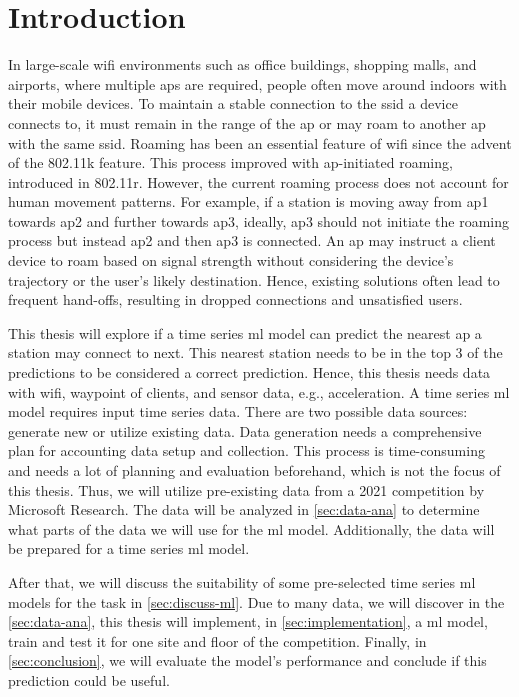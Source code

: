 \chapter{Introduction}\label{sec:intro}

In large-scale \ac{wifi} environments such as office buildings, shopping malls, and airports, where multiple \acp{ap} are required, people often move around indoors with their mobile devices.
To maintain a stable connection to the \ac{ssid} a device connects to, it must remain in the range of the \ac{ap} or may roam to another \ac{ap} with the same \ac{ssid}.
Roaming has been an essential feature of \ac{wifi} since the advent of the 802.11k\cite{802.11k} feature.
This process improved with \ac{ap}-initiated roaming, introduced in 802.11r\cite{802.11r}.
However, the current roaming process does not account for human movement patterns. 
For example, if a station is moving away from \ac{ap}1 towards \ac{ap}2 and further towards \ac{ap}3, ideally, \ac{ap}3 should not initiate the roaming process but instead \ac{ap}2 and then \ac{ap}3 is connected.
An \ac{ap} may instruct a client device to roam based on signal strength without considering the device's trajectory or the user's likely destination.
Hence, existing solutions often lead to frequent hand-offs, resulting in dropped connections and unsatisfied users.

This thesis will explore if a time series \ac{ml} model can predict the nearest \ac{ap} a station may connect to next.
This nearest station needs to be in the top 3 of the predictions to be considered a correct prediction.
Hence, this thesis needs data with \ac{wifi}, waypoint of clients, and sensor data, e.g., acceleration.
A time series \ac{ml} model requires input time series data.
There are two possible data sources: generate new or utilize existing data. 
Data generation needs a comprehensive plan for accounting data setup and collection.
This process is time-consuming and needs a lot of planning and evaluation beforehand, which is not the focus of this thesis.
Thus, we will utilize pre-existing data from a 2021 competition by Microsoft Research\cite{IndoorLocationNavigation}.
The data will be analyzed in \cref{sec:data-ana} to determine what parts of the data we will use for the \ac{ml} model.
Additionally, the data will be prepared for a time series \ac{ml} model.

After that, we will discuss the suitability of some pre-selected time series \ac{ml} models for the task in \cref{sec:discuss-ml}. 
Due to many data, we will discover in the \cref{sec:data-ana}, this thesis will implement, in \cref{sec:implementation}, a \ac{ml} model, train and test it for one site and floor of the competition.
Finally, in \cref{sec:conclusion}, we will evaluate the model's performance and conclude if this prediction could be useful.

